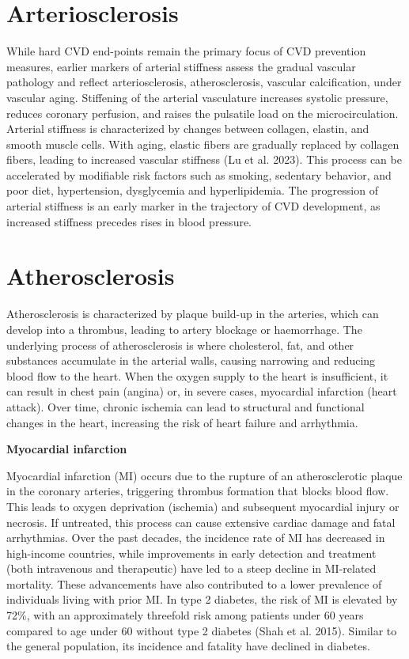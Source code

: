 \documentclass[
  a4paper,
  headsepline=true,
  open=any]{scrbook}
\begin{document}
\hypertarget{arteriosclerosis}{%
\section{Arteriosclerosis}\label{arteriosclerosis}}

While hard CVD end-points remain the primary focus of CVD prevention
measures, earlier markers of arterial stiffness assess the gradual
vascular pathology and reflect arteriosclerosis, atherosclerosis,
vascular calcification, under vascular aging. Stiffening of the arterial
vasculature increases systolic pressure, reduces coronary perfusion, and
raises the pulsatile load on the microcirculation. Arterial stiffness is
characterized by changes between collagen, elastin, and smooth muscle
cells. With aging, elastic fibers are gradually replaced by collagen
fibers, leading to increased vascular stiffness (Lu et al. 2023). This
process can be accelerated by modifiable risk factors such as smoking,
sedentary behavior, and poor diet, hypertension, dysglycemia and
hyperlipidemia. The progression of arterial stiffness is an early marker
in the trajectory of CVD development, as increased stiffness precedes
rises in blood pressure.

\hypertarget{atherosclerosis}{%
\section{Atherosclerosis}\label{atherosclerosis}}

Atherosclerosis is characterized by plaque build-up in the arteries,
which can develop into a thrombus, leading to artery blockage or
haemorrhage. The underlying process of atherosclerosis is where
cholesterol, fat, and other substances accumulate in the arterial walls,
causing narrowing and reducing blood flow to the heart. When the oxygen
supply to the heart is insufficient, it can result in chest pain
(angina) or, in severe cases, myocardial infarction (heart attack). Over
time, chronic ischemia can lead to structural and functional changes in
the heart, increasing the risk of heart failure and arrhythmia.

\textbf{Myocardial infarction}

Myocardial infarction (MI) occurs due to the rupture of an
atherosclerotic plaque in the coronary arteries, triggering thrombus
formation that blocks blood flow. This leads to oxygen deprivation
(ischemia) and subsequent myocardial injury or necrosis. If untreated,
this process can cause extensive cardiac damage and fatal arrhythmias.
Over the past decades, the incidence rate of MI has decreased in
high-income countries, while improvements in early detection and
treatment (both intravenous and therapeutic) have led to a steep decline
in MI-related mortality. These advancements have also contributed to a
lower prevalence of individuals living with prior MI. In type 2
diabetes, the risk of MI is elevated by 72\%, with an approximately
threefold risk among patients under 60 years compared to age under 60
without type 2 diabetes (Shah et al. 2015). Similar to the general
population, its incidence and fatality have declined in diabetes.
\end{document}
